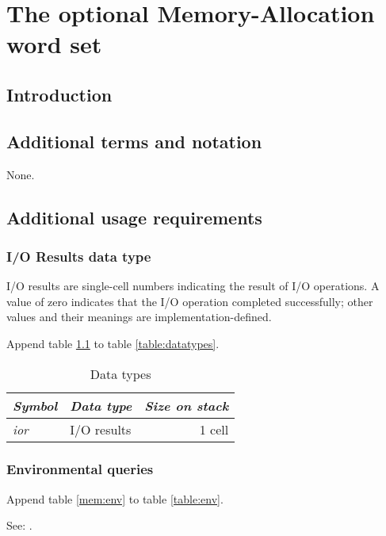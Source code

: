 \chapter{The optional Memory-Allocation word set} %

\section{Introduction} %

\section{Additional terms and notation} %
None.

\section{Additional usage requirements} %

\subsection{I/O Results data type} %
\label{mem:ior}

I/O results are single-cell numbers indicating the result of I/O
operations. A value of zero indicates that the I/O operation
completed successfully; other values and their meanings are
implementation-defined.

Append table \ref{mem:types} to table \ref{table:datatypes}.

\begin{table}[h]
  \begin{center}
	\caption{Data types}
	\label{mem:types}
	\begin{tabular}{llr}
	\hline\hline
	\emph{Symbol} & \emph{Data type} & \emph{Size on stack} \\
	\hline
	\emph{ior}		& I/O results			& 1 cell \\
	\hline\hline
	\end{tabular}
  \end{center}
\end{table}


\subsection{Environmental queries} %

Append table \ref{mem:env} to table \ref{table:env}.

See: .

